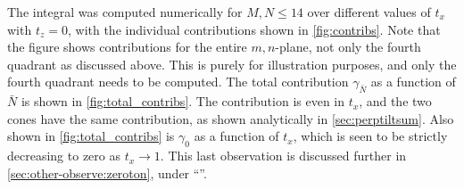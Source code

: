 The integral was computed numerically for \( M,N \leq 14 \) over different values of \( t_x \) with \( t_z = 0 \), with the individual contributions shown in \cref{fig:contribs}.
Note that the figure shows contributions for the entire \( m,n \)-plane, not only the fourth quadrant as discussed above.
This is purely for illustration purposes, and only the fourth quadrant needs to be computed.
The total contribution \( \gamma_{\bar{N}} \) as a function of \( \bar{N} \) is shown in \cref{fig:total_contribs}.
The contribution is even in \( t_x \), and the two cones have the same contribution, as shown analytically in \cref{sec:perptiltsum}.
Also shown in \cref{fig:total_contribs} is \( \gamma_0 \) as a function of \( t_x \), which is seen to be strictly decreasing to zero as \( t_x \to 1 \).
This last observation is discussed further in \cref{sec:other-observe:zeroton}, under
``''.


